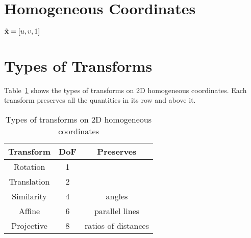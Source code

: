 \section{Homogeneous Coordinates} \label{sec:3d_geom/homo_coords}
$\tilde{\mathbf{x}} = [u, v, 1]$

\section{Types of Transforms} \label{sec:3d_geom/transforms}

Table~\ref{tab:transform_types} shows the types of transforms on 2D homogeneous coordinates. Each transform preserves all the quantities in its row and above it.

\begin{table}
\centering
\begin{tabular}{c|c|c}
Transform & DoF & Preserves\\
\hline
Rotation & 1 & \\
Translation & 2 & \\
Similarity & 4 & angles \\
Affine & 6 & parallel lines \\
Projective & 8 & ratios of distances\\
\end{tabular}
\caption{Types of transforms on 2D homogeneous coordinates}
\label{tab:transform_types}
\end{table}